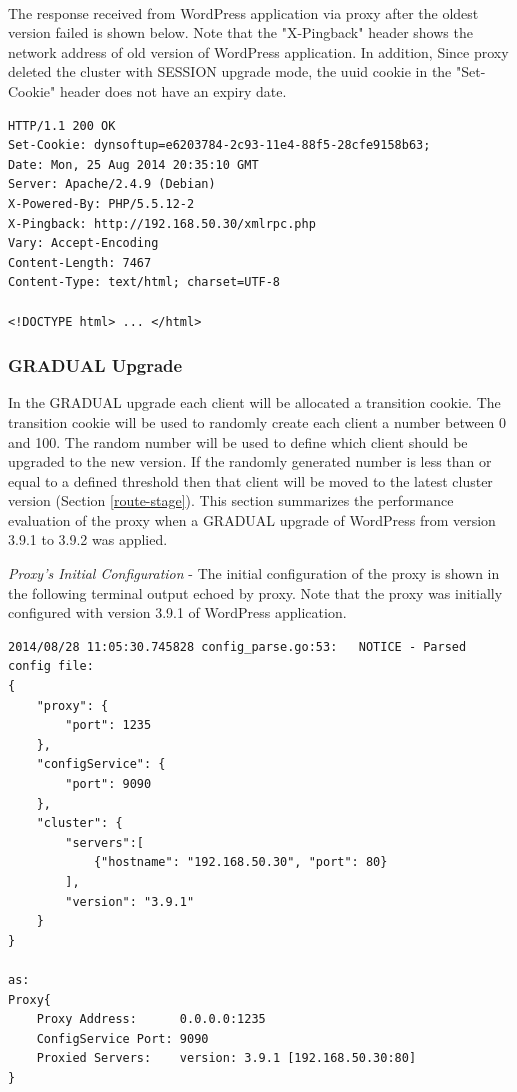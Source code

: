 \documentclass[a4paper,11pt,twoside]{report}
\begin{document}
\noindent\\
The response received from WordPress application via proxy after the oldest version failed is shown below. Note that the "X-Pingback" header shows the network address of old version of WordPress application. In addition, Since proxy deleted the cluster with SESSION upgrade mode, the uuid cookie in the "Set-Cookie" header does not have an expiry date.\smallskip 

\begin{lstlisting}[language=terminal]
HTTP/1.1 200 OK
Set-Cookie: dynsoftup=e6203784-2c93-11e4-88f5-28cfe9158b63;
Date: Mon, 25 Aug 2014 20:35:10 GMT
Server: Apache/2.4.9 (Debian)
X-Powered-By: PHP/5.5.12-2
X-Pingback: http://192.168.50.30/xmlrpc.php
Vary: Accept-Encoding
Content-Length: 7467
Content-Type: text/html; charset=UTF-8

<!DOCTYPE html> ... </html>
\end{lstlisting}

\subsubsection*{GRADUAL Upgrade}
In the GRADUAL upgrade each client will be allocated a transition cookie. The transition cookie will be used to randomly create each client a number between 0 and 100. The random number will be used to define which client should be upgraded to the new version. If the randomly generated number is less than or equal to a defined threshold then that client will be moved to the latest cluster version (Section \ref{route-stage}). This section summarizes the performance evaluation of the proxy when a GRADUAL upgrade of WordPress from version 3.9.1 to 3.9.2 was applied. \medskip

\noindent
\textit{Proxy's Initial Configuration} - The initial configuration of the proxy is shown in the following terminal output echoed by proxy. Note that the proxy was initially configured with version 3.9.1 of WordPress application.\smallskip

\begin{lstlisting}[language=terminal]
2014/08/28 11:05:30.745828 config_parse.go:53:   NOTICE - Parsed config file:
{
    "proxy": {
        "port": 1235
    },
    "configService": {
        "port": 9090
    },
    "cluster": {
        "servers":[
            {"hostname": "192.168.50.30", "port": 80}
        ],
        "version": "3.9.1"
    }
}

as:
Proxy{
	Proxy Address:      0.0.0.0:1235
	ConfigService Port: 9090
	Proxied Servers:    version: 3.9.1 [192.168.50.30:80]
}
\end{lstlisting}
\end{document}
